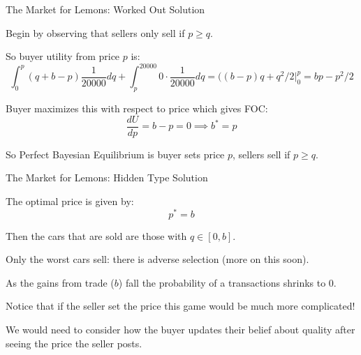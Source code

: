 \documentclass[aspectratio=169]{beamer}
\newenvironment{wideitemize}{\itemize\addtolength{\itemsep}{10pt}}{\enditemize}
\begin{document}
\begin{frame}{The Market for Lemons: Worked Out Solution}
    \begin{wideitemize}
        \item Begin by observing that sellers only sell if $p\geq q$.
        \item So buyer utility from price $p$ is:
        \[\int^p_0 (q+b-p)\frac{1}{20000}dq + \int_p^{20000} 0 \cdot \frac{1}{20000} dq = ((b-p)q +q^2/2|^p_0 = bp-p^2/2  \]
        \item Buyer maximizes this with respect to price which gives FOC:
        \[\frac{dU}{dp} = b - p =0 \implies b^*=p\]
        \item So Perfect Bayesian Equilibrium is buyer sets price $p$, sellers sell if $p\geq q$.
    \end{wideitemize}
\end{frame}
\begin{frame}{The Market for Lemons: Hidden Type Solution}

\begin{wideitemize}
    \item The optimal price is given by:
    \[p^* = b\]
    \item Then the cars that are sold are those with $q\in [0,b]$.
    \item Only the worst cars sell: there is adverse selection (more on this soon).
    \item As the gains from trade ($b$) fall the probability of a transactions shrinks to 0.
    \item Notice that if the seller set the price this game would be much more complicated! 
    \item We would need to consider how the buyer updates their belief about quality after seeing the price the seller posts.
\end{wideitemize}
    
\end{frame}
\end{document}
